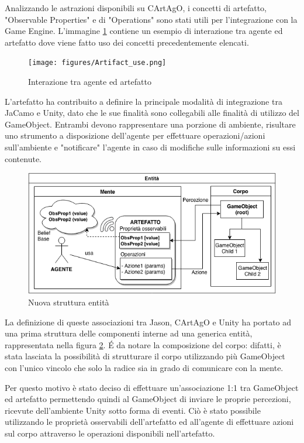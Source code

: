 \medskip

Analizzando le astrazioni disponibili su CArtAgO, i concetti di artefatto, "Observable Properties" e di "Operations" sono stati utili per l'integrazione con la Game Engine. L'immagine \ref{artifact_use} contiene un esempio di interazione tra agente ed artefatto dove viene fatto uso dei concetti precedentemente elencati.

\begin{figure}[H]
\centering
\texttt{[image: figures/Artifact\_use.png]}
\caption{Interazione tra agente ed artefatto}
\label{artifact_use}
\end{figure}

L'artefatto ha contribuito a definire la principale modalità di integrazione tra JaCamo e Unity, dato che le sue finalità sono collegabili alle finalità di utilizzo del GameObject. Entrambi devono rappresentare una porzione di ambiente, risultare uno strumento a disposizione dell'agente per effettuare operazioni/azioni sull'ambiente e "notificare" l'agente in caso di modifiche sulle informazioni su essi contenute.

\begin{figure}[H]
\centering
\includegraphics[width=\linewidth]{figures/Ridefinizione_entita.png}
\caption{Nuova struttura entità}
\label{struttura_nuova_entita}
\end{figure}

La definizione di queste associazioni tra Jason, CArtAgO e Unity ha portato ad una prima struttura delle componenti interne ad una generica entità, rappresentata nella figura \ref{struttura_nuova_entita}. \'E da notare la composizione del corpo: difatti, è stata lasciata la possibilità di strutturare il corpo utilizzando più GameObject con l'unico vincolo che solo la radice sia in grado di comunicare con la mente. 

\medskip

Per questo motivo è stato deciso di effettuare un'associazione 1:1 tra GameObject ed artefatto permettendo quindi al GameObject di inviare le proprie percezioni, ricevute dell'ambiente Unity sotto forma di eventi. Ciò è stato possibile utilizzando le proprietà osservabili dell'artefatto ed all'agente di effettuare azioni sul corpo attraverso le operazioni disponibili nell'artefatto. 

